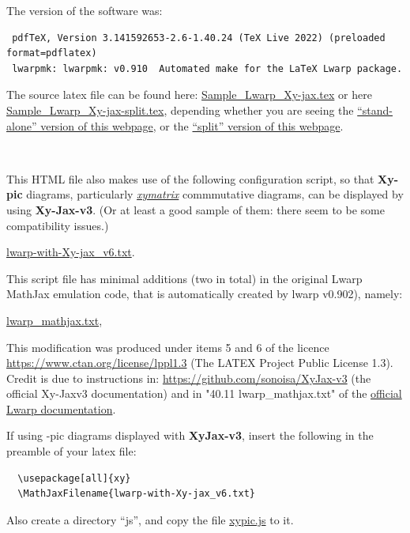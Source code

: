 \documentclass[a4paper,12pt]{article}
\newtheorem{Fundamental Theorem}{Fundamental Theorem}
\begin{document}
\medskip
The version of the software was:
\begin{verbatim}
 pdfTeX, Version 3.141592653-2.6-1.40.24 (TeX Live 2022) (preloaded format=pdflatex)
 lwarpmk: lwarpmk: v0.910  Automated make for the LaTeX Lwarp package.
\end{verbatim}

The source latex file can be found here: \href{Sample_Lwarp_Xy-jax.tex}{Sample\_Lwarp\_Xy-jax.tex}  or here \href{Sample_Lwarp_Xy-jax-split.tex}{Sample\_Lwarp\_Xy-jax-split.tex}, depending whether you are seeing the  \href{Sample_Lwarp_Xy-jax.html}{``stand-alone'' version of this webpage}, or the
   \href{Sample_Lwarp_Xy-jax-split-index.html}{``split'' version of this webpage}.


\

 \noindent This HTML file  also makes use of the following configuration script, so that {\textbf{Xy-pic}} diagrams, particularly \href{https://www.ctan.org/pkg/xymatrix}{\textit{xymatrix}} commmutative diagrams, can be displayed by using \textbf{Xy-Jax-v3}. (Or at least a good sample  of them: there seem to be some compatibility issues.)\\
\begin{center}
\href{lwarp-with-Xy-jax_v6.txt}{lwarp-with-Xy-jax\_v6.txt}.
\end{center}
This script file has minimal additions (two in total) in the original Lwarp MathJax emulation code, that is automatically created by  lwarp v0.902), namely:
\begin{center} \href{lwarp_mathjax.txt}{lwarp\_mathjax.txt}, \end{center}

\noindent This modification was produced under items 5 and 6 of the licence \url{https://www.ctan.org/license/lppl1.3}  (The LATEX Project Public License 1.3).
\\
Credit is  due to instructions in: \url{https://github.com/sonoisa/XyJax-v3} (the official Xy-Jaxv3 documentation) and in  "40.11 lwarp\_mathjax.txt" of the \href{http://mirrors.ibiblio.org/CTAN/macros/latex/contrib/lwarp/lwarp.pdf}{official Lwarp documentation}.


\bigskip

 If using \Xy-pic diagrams displayed with {\textbf{XyJax-v3}}, insert the following in the preamble of your latex file:
\begin{verbatim}
  \usepackage[all]{xy}
  \MathJaxFilename{lwarp-with-Xy-jax_v6.txt}
\end{verbatim}
Also create a directory ``js'', and copy the file  \href{https://raw.githubusercontent.com/sonoisa/XyJax-v3/master/build/xypic.js}{xypic.js} to it.
\end{document}
